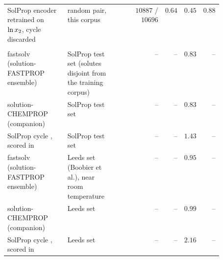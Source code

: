 \begin{tabular}{@{}L{0.28\linewidth}L{0.23\linewidth}rrrr@{}}
SolProp encoder retrained on $\ln x_2$, cycle discarded & random pair, this corpus & $10887$ / $10696$ & $0.64$ & $0.45$ & $0.88$ \\
\addlinespace[2pt]
\\
fastsolv (solution-FASTPROP ensemble) \cite{osanloo2024} & SolProp test set (solutes disjoint from the training corpus) & -- & -- & $0.83$ & -- \\
solution-CHEMPROP (companion) \cite{osanloo2024} & SolProp test set & -- & -- & $0.83$ & -- \\
SolProp cycle \cite{vermeire2022solprop}, scored in \cite{osanloo2024} & SolProp test set & -- & -- & $1.43$ & -- \\
fastsolv (solution-FASTPROP ensemble) \cite{osanloo2024} & Leeds set (Boobier et al.), near room temperature & -- & -- & $0.95$ & -- \\
solution-CHEMPROP (companion) \cite{osanloo2024} & Leeds set & -- & -- & $0.99$ & -- \\
SolProp cycle \cite{vermeire2022solprop}, scored in \cite{osanloo2024} & Leeds set & -- & -- & $2.16$ & -- \\
\bottomrule
\end{tabular}
